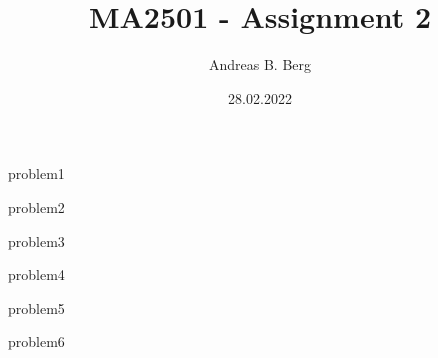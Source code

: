 \documentclass{article}
\begin{document}
\mainmatter

\title{MA2501 - Assignment 2}
\author{Andreas B. Berg}
\date{28.02.2022}
\maketitle
\thispagestyle{fancy}

{problem1}

\pagebreak
{problem2}

\pagebreak
{problem3}

\pagebreak
{problem4}


{problem5}

\pagebreak
{problem6}

\end{document}
